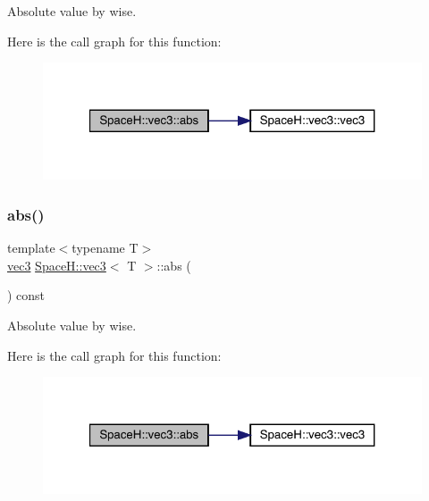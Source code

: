 Absolute value by wise. 

Here is the call graph for this function\+:
\nopagebreak
\begin{figure}[H]
\begin{center}
\leavevmode
\includegraphics[width=321pt]{struct_space_h_1_1vec3_af82905f49546b9aa03799dcd87bdff0c_cgraph}
\end{center}
\end{figure}
\mbox{\label{struct_space_h_1_1vec3_af82905f49546b9aa03799dcd87bdff0c}} 
\subsubsection{\texorpdfstring{abs()}{abs()}\hspace{0.1cm}{\footnotesize\ttfamily [3/4]}}
{\footnotesize\ttfamily template$<$typename T$>$ \\
\mbox{\hyperlink{struct_space_h_1_1vec3}{vec3}} \mbox{\hyperlink{struct_space_h_1_1vec3}{Space\+H\+::vec3}}$<$ T $>$\+::abs (\begin{DoxyParamCaption}{ }\end{DoxyParamCaption}) const\hspace{0.3cm}{\ttfamily [inline]}}



Absolute value by wise. 

Here is the call graph for this function\+:
\nopagebreak
\begin{figure}[H]
\begin{center}
\leavevmode
\includegraphics[width=321pt]{struct_space_h_1_1vec3_af82905f49546b9aa03799dcd87bdff0c_cgraph}
\end{center}
\end{figure}
\mbox{\label{struct_space_h_1_1vec3_af82905f49546b9aa03799dcd87bdff0c}} 
